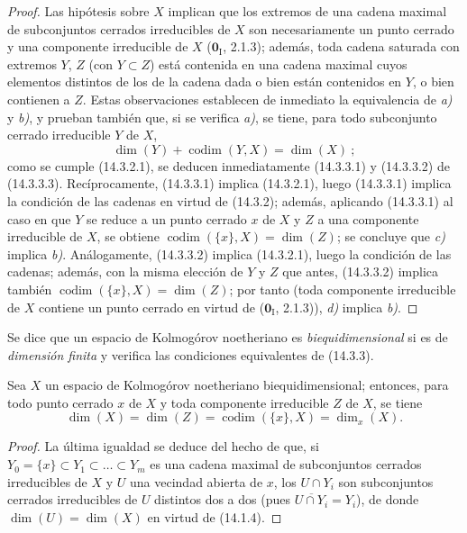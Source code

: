 \begin{proof}
Las hipótesis sobre $X$ implican que los extremos de una cadena maximal de
subconjuntos cerrados irreducibles de $X$ son necesariamente un punto cerrado y
una componente irreducible de $X$ ($\mathbf{0}_{\mathrm I}$, 2.1.3); además, toda
cadena saturada con extremos $Y$, $Z$ (con $Y\subset Z$) está contenida en una
cadena maximal cuyos elementos distintos de los de la cadena dada o bien están
contenidos en $Y$, o bien contienen a $Z$. Estas observaciones establecen de
inmediato la equivalencia de \emph{a)} y \emph{b)}, y prueban también que, si se verifica \emph{a)},
se tiene, para todo subconjunto cerrado irreducible $Y$ de $X$,
\[
  \dim(Y)+\operatorname{codim}(Y,X)=\dim(X)~;
  \tag{14.3.3.3}\label{0.14.3.3.3-fr}
\]
como se cumple (14.3.2.1), se deducen inmediatamente (14.3.3.1) y (14.3.3.2)
de (14.3.3.3). Recíprocamente, (14.3.3.1) implica (14.3.2.1), luego
(14.3.3.1) implica la condición de las cadenas en virtud de (14.3.2); además,
aplicando (14.3.3.1) al caso en que $Y$ se reduce a un punto cerrado $x$ de $X$
y $Z$ a una componente irreducible de $X$, se obtiene
$\operatorname{codim}(\{x\},X)=\dim(Z)$; se concluye que \emph{c)} implica \emph{b)}.
Análogamente, (14.3.3.2) implica (14.3.2.1), luego la condición de las cadenas;
además, con la misma elección de $Y$ y $Z$ que antes, (14.3.3.2) implica
también $\operatorname{codim}(\{x\},X)=\dim(Z)$; por tanto (toda componente
irreducible de $X$ contiene un punto cerrado en virtud de ($\mathbf{0}_{\mathrm I}$,
2.1.3)), \emph{d)} implica \emph{b)}.
\end{proof}

Se dice que un espacio de Kolmogórov noetheriano es \emph{biequidimensional}
si es de \emph{dimensión finita} y verifica las condiciones equivalentes de
(14.3.3).

\begin{corollary}[14.3.4]
\label{0.14.3.4-fr}
Sea $X$ un espacio de Kolmogórov noetheriano biequidimensional; entonces, para
todo punto cerrado $x$ de $X$ y toda componente irreducible $Z$ de $X$, se tiene
\[
  \dim(X)=\dim(Z)=\operatorname{codim}(\{x\},X)=\dim_x(X).
  \tag{14.3.4.1}\label{0.14.3.4.1-fr}
\]
\end{corollary}

\begin{proof}
La última igualdad se deduce del hecho de que, si
$Y_0=\{x\}\subset Y_1\subset\ldots\subset Y_m$ es una cadena maximal de
subconjuntos cerrados irreducibles de $X$ y $U$ una vecindad abierta de $x$, los
$U\cap Y_i$ son subconjuntos cerrados irreducibles de $U$ distintos dos a dos
(pues $\overline{U\cap Y_i}=Y_i$), de donde
$\dim(U)=\dim(X)$ en virtud de (14.1.4).
\end{proof}

